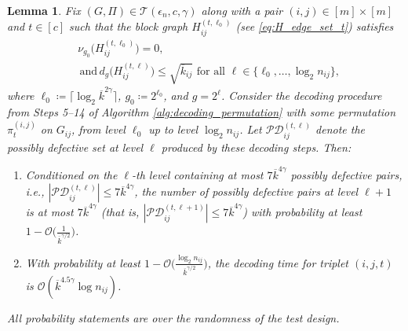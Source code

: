 \documentclass[journal]{IEEEtran}
\newtheorem{lemma}{Lemma}
\theoremstyle{definition}
\theoremstyle{definition}
\newcommand{\Tc}{\mathcal{T}}
\newcommand{\PV}{\nu}
\newcommand{\kb}{\overline{k}}
\newcommand{\bigO}{\mathcal{O}}
\begin{document}
\begin{lemma} \label{lem:pd_size_permutation_level}
Fix $(G,\Pi)\in \Tc(\epsilon_n,c,\gamma)$ along with a pair $(i,j)\in[m]\times[m]$ and $t\in[c]$ such that the block graph $H^{(t,\ell_0)}_{ij}$ (see \eqref{eq:H_edge_set_t}) satisfies
\begin{align*}
    &\PV_{g_0}\bigl(H^{(t,\ell_0)}_{ij}\bigr)=0, \\
    &\,\text{and}\,
       d_{g}\bigl(H^{(t,\ell)}_{ij}\bigr)\le \sqrt{\kb_{ij}} 
       \text{ for all } \ell \in \{\ell_0,\dots,\log_2 n_{ij} \},
\end{align*}
where $\ell_0\coloneqq \lceil \log_2 \kb^{2\gamma}\rceil$, $g_0 \coloneqq 2^{\ell_0}$, and $g = 2^\ell$. Consider the decoding procedure from Steps 5--14 of Algorithm \ref{alg:decoding_permutation} with some permutation $\pi_t^{(i,j)}$ on $G_{ij}$, from level $\ell_0$ up to level $\log_2 n_{ij}$. Let $\mathcal{PD}_{ij}^{(t,\ell)}$ denote the possibly defective set at level $\ell$ produced by these decoding steps. Then:
\begin{enumerate}
  \item Conditioned on the $\ell$-th level containing at most $7\kb^{4\gamma}$ possibly defective pairs, i.e., $|\mathcal{PD}_{ij}^{(t,\ell)}|\le 7\kb^{4\gamma}$, the number of possibly defective pairs at level $\ell+1$ is at most $7\kb^{4\gamma}$ (that is, $|\mathcal{PD}_{ij}^{(t,\ell+1)}|\le 7\kb^{4\gamma}$) with probability at least $1-\bigO \big( \tfrac{1}{\kb^{\gamma/2}}\big)$.
  \item With probability at least $1-\bigO \big( \tfrac{\log_2 n_{ij}}{\kb^{\gamma/2}} \big)$, the decoding time for triplet $(i,j,t)$ is $\bigO(\kb^{4.5\gamma}\log n_{ij})$.
\end{enumerate}
All probability statements are over the randomness of the test design.
\end{lemma}
\end{document}
